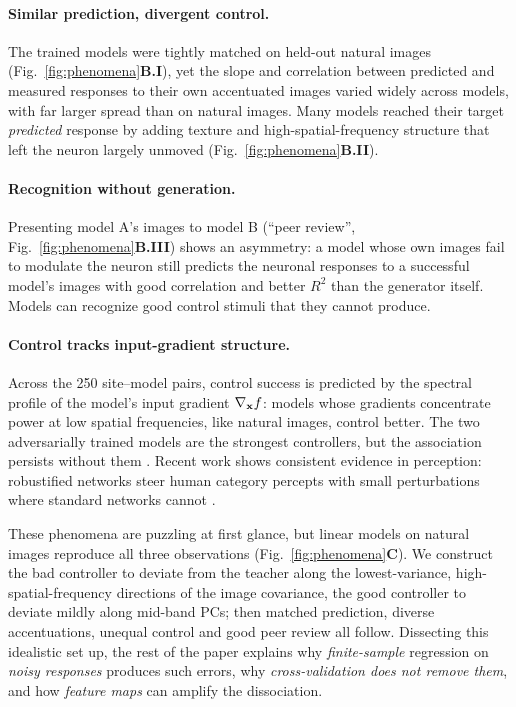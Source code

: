 \paragraph{Similar prediction, divergent control.}
The trained models were tightly matched on held-out natural images (Fig.~\ref{fig:phenomena}\textbf{B.I}), yet the slope and correlation between predicted and measured responses to their own accentuated images varied widely across models, with far larger spread than on natural images. Many models reached their target \emph{predicted} response by adding texture and high-spatial-frequency structure that left the neuron largely unmoved (Fig.~\ref{fig:phenomena}\textbf{B.II}).

\paragraph{Recognition without generation.}
Presenting model A's images to model B (``peer review'', Fig.~\ref{fig:phenomena}\textbf{B.III}) shows an asymmetry: a model whose own images fail to modulate the neuron still predicts the neuronal responses to a successful model's images with good correlation and better $R^2$ than the generator itself. Models can recognize good control stimuli that they cannot produce.

\paragraph{Control tracks input-gradient structure.}
Across the 250 site--model pairs, control success is predicted by the spectral profile of the model's input gradient $\nabla_{\mathbf{x}} f$: models whose gradients concentrate power at low spatial frequencies, like natural images, control better. The two adversarially trained models are the strongest controllers, but the association persists without them \citepPW. Recent work shows consistent evidence in perception: robustified networks steer human category percepts with small perturbations where standard networks cannot \citep{gaziv2023strongPreciseModulation}.

These phenomena are puzzling at first glance, but linear models on natural images reproduce all three observations (Fig.~\ref{fig:phenomena}\textbf{C}). We construct the bad controller to deviate from the teacher along the lowest-variance, high-spatial-frequency directions of the image covariance, the good controller to deviate mildly along mid-band PCs; then matched prediction, diverse accentuations, unequal control and good peer review all follow. Dissecting this idealistic set up, the rest of the paper explains why \textit{finite-sample} regression on \textit{noisy responses} produces such errors, why \textit{cross-validation does not remove them}, and how \textit{feature maps} can amplify the dissociation.

